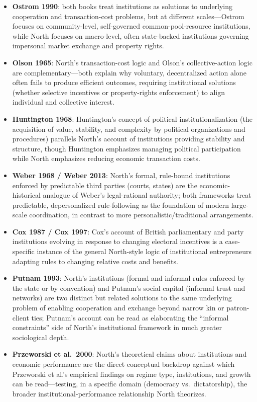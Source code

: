 \documentclass[12pt]{article}
\begin{document}
\begin{itemize}[leftmargin=*, itemsep=4pt]
    \item \textbf{Ostrom 1990}: both books treat institutions as solutions to underlying cooperation and transaction-cost problems, but at different scales---Ostrom focuses on community-level, self-governed common-pool-resource institutions, while North focuses on macro-level, often state-backed institutions governing impersonal market exchange and property rights.
    \item \textbf{Olson 1965}: North's transaction-cost logic and Olson's collective-action logic are complementary---both explain why voluntary, decentralized action alone often fails to produce efficient outcomes, requiring institutional solutions (whether selective incentives or property-rights enforcement) to align individual and collective interest.
    \item \textbf{Huntington 1968}: Huntington's concept of political institutionalization (the acquisition of value, stability, and complexity by political organizations and procedures) parallels North's account of institutions providing stability and structure, though Huntington emphasizes managing political participation while North emphasizes reducing economic transaction costs.
    \item \textbf{Weber 1968 / Weber 2013}: North's formal, rule-bound institutions enforced by predictable third parties (courts, states) are the economic-historical analogue of Weber's legal-rational authority; both frameworks treat predictable, depersonalized rule-following as the foundation of modern large-scale coordination, in contrast to more personalistic/traditional arrangements.
    \item \textbf{Cox 1987 / Cox 1997}: Cox's account of British parliamentary and party institutions evolving in response to changing electoral incentives is a case-specific instance of the general North-style logic of institutional entrepreneurs adapting rules to changing relative costs and benefits.
    \item \textbf{Putnam 1993}: North's institutions (formal and informal rules enforced by the state or by convention) and Putnam's social capital (informal trust and networks) are two distinct but related solutions to the same underlying problem of enabling cooperation and exchange beyond narrow kin or patron-client ties; Putnam's account can be read as elaborating the ``informal constraints'' side of North's institutional framework in much greater sociological depth.
    \item \textbf{Przeworski et al.\ 2000}: North's theoretical claims about institutions and economic performance are the direct conceptual backdrop against which Przeworski et al.'s empirical findings on regime type, institutions, and growth can be read---testing, in a specific domain (democracy vs.\ dictatorship), the broader institutional-performance relationship North theorizes.
\end{itemize}
\end{document}
